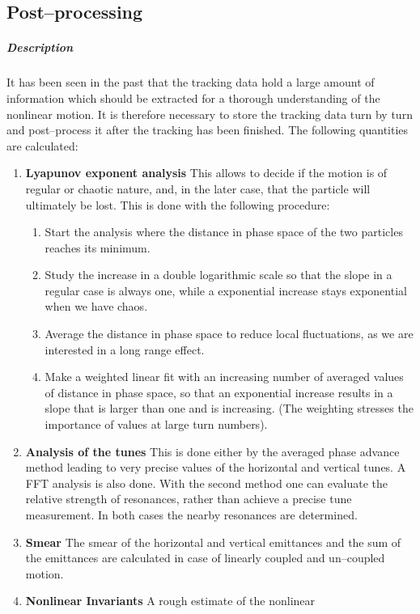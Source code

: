 \subsection{Post--processing} \label{PosPro}

\subparagraph{Description} It has been seen in the past that the
tracking data hold a large amount of information which should be
extracted for a thorough understanding of the nonlinear motion. It is
therefore necessary to store the tracking data turn by turn and
post--process it after the tracking has been finished. The following
quantities are calculated:
\begin{enumerate}
\item {\bf Lyapunov exponent analysis} This allows to decide if the
  motion is of regular or chaotic nature, and, in the later case, that
  the particle will ultimately be lost.  This is done with the
  following procedure:
 \begin{enumerate}
 \item Start the analysis where the distance in phase space of the two
   particles reaches its minimum.
 \item Study the increase in a double logarithmic scale so that the
   slope in a regular case is always one, while a exponential increase
   stays exponential when we have chaos.
 \item Average the distance in phase space to reduce local
   fluctuations, as we are interested in a long range effect.
 \item Make a weighted linear fit with an increasing number of
   averaged values of distance in phase space, so that an exponential
   increase results in a slope that is larger than one and is
   increasing. (The weighting stresses the importance of values at
   large turn numbers).
 \end{enumerate}
\item {\bf Analysis of the tunes} This is done either by the averaged
  phase advance method leading to very precise values of the
  horizontal and vertical tunes. A FFT analysis is also done.  With
  the second method one can evaluate the relative strength of
  resonances, rather than achieve a precise tune measurement. In both
  cases the nearby resonances are determined.
\item {\bf Smear} The smear of the horizontal and vertical emittances
  and the sum of the emittances are calculated in case of linearly
  coupled and un--coupled motion.
\item {\bf Nonlinear Invariants} A rough estimate of the nonlinear

\end{enumerate}
